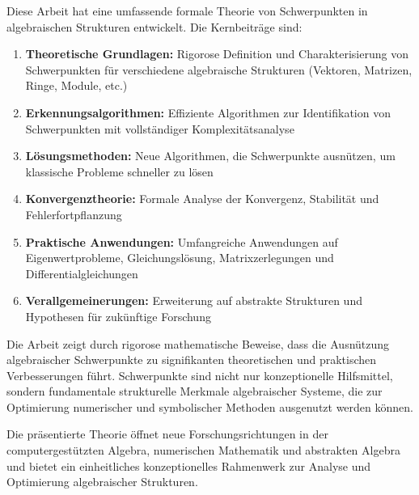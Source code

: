 \documentclass[a4paper,12pt]{article}
\theoremstyle{definition}
\begin{document}
Diese Arbeit hat eine umfassende formale Theorie von Schwerpunkten in algebraischen Strukturen entwickelt. Die Kernbeiträge sind:

\begin{enumerate}
\item \textbf{Theoretische Grundlagen:} Rigorose Definition und Charakterisierung von Schwerpunkten für verschiedene algebraische Strukturen (Vektoren, Matrizen, Ringe, Module, etc.)

\item \textbf{Erkennungsalgorithmen:} Effiziente Algorithmen zur Identifikation von Schwerpunkten mit vollständiger Komplexitätsanalyse

\item \textbf{Lösungsmethoden:} Neue Algorithmen, die Schwerpunkte ausnützen, um klassische Probleme schneller zu lösen

\item \textbf{Konvergenztheorie:} Formale Analyse der Konvergenz, Stabilität und Fehlerfortpflanzung

\item \textbf{Praktische Anwendungen:} Umfangreiche Anwendungen auf Eigenwertprobleme, Gleichungslösung, Matrixzerlegungen und Differentialgleichungen

\item \textbf{Verallgemeinerungen:} Erweiterung auf abstrakte Strukturen und Hypothesen für zukünftige Forschung
\end{enumerate}

Die Arbeit zeigt durch rigorose mathematische Beweise, dass die Ausnützung algebraischer Schwerpunkte zu signifikanten theoretischen und praktischen Verbesserungen führt. Schwerpunkte sind nicht nur konzeptionelle Hilfsmittel, sondern fundamentale strukturelle Merkmale algebraischer Systeme, die zur Optimierung numerischer und symbolischer Methoden ausgenutzt werden können.

Die präsentierte Theorie öffnet neue Forschungsrichtungen in der computergestützten Algebra, numerischen Mathematik und abstrakten Algebra und bietet ein einheitliches konzeptionelles Rahmenwerk zur Analyse und Optimierung algebraischer Strukturen.
\end{document}
